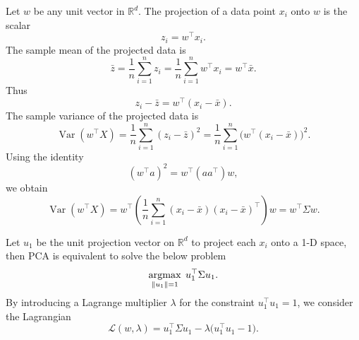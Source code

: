 \documentclass[../main]{subfiles}
\begin{document}
        \begin{lemma}
            Let $w$ be any unit vector in $\mathbb{R}^d$.  
            The projection of a data point $x_i$ onto $w$ is the scalar
            \begin{equation}
                z_i = w^\top x_i .
            \end{equation}
            The sample mean of the projected data is
            \begin{equation}
                \bar{z} = \frac{1}{n}\sum_{i=1}^n z_i
                       = \frac{1}{n}\sum_{i=1}^n w^\top x_i
                       = w^\top \bar{x}.
            \end{equation}
            Thus
            \begin{equation}
                z_i - \bar{z}
                = w^\top (x_i - \bar{x}).
            \end{equation}
            The sample variance of the projected data is
            \begin{equation}
                \operatorname{Var}(w^\top X)
                = \frac{1}{n} \sum_{i=1}^n (z_i - \bar{z})^2
                = \frac{1}{n} \sum_{i=1}^n 
                    \bigl( w^\top (x_i - \bar{x}) \bigr)^2 .
            \end{equation}
            Using the identity 
            \[
            (w^\top a)^2 = w^\top (a a^\top) w,
            \]
            we obtain
            \begin{equation}
                \operatorname{Var}(w^\top X)
                = w^\top
                  \left(
                     \frac{1}{n}\sum_{i=1}^n (x_i - \bar{x})(x_i - \bar{x})^\top
                  \right)
                  w
                = w^\top \Sigma w.
            \end{equation}
            \end{lemma}
    Let $u_1$ be the unit projection vector on $\mathbb R^d$ to project each $x_i$ onto a 1-D space, then PCA is equivalent to solve the below problem
    \begin{equation}
        \mathop{\mathrm{argmax}}_{\|u_1\|=1}\; u_1^\top \Sigma u_1 .
    \end{equation}
    By introducing a Lagrange multiplier $\lambda$ for the constraint $u_1^\top u_1 = 1$, we consider the Lagrangian
    \begin{equation}
        \mathcal{L}(w,\lambda)
        = u_1^\top \Sigma u_1 - \lambda \bigl( u_1^\top u_1 - 1 \bigr).
    \end{equation}
\end{document}
